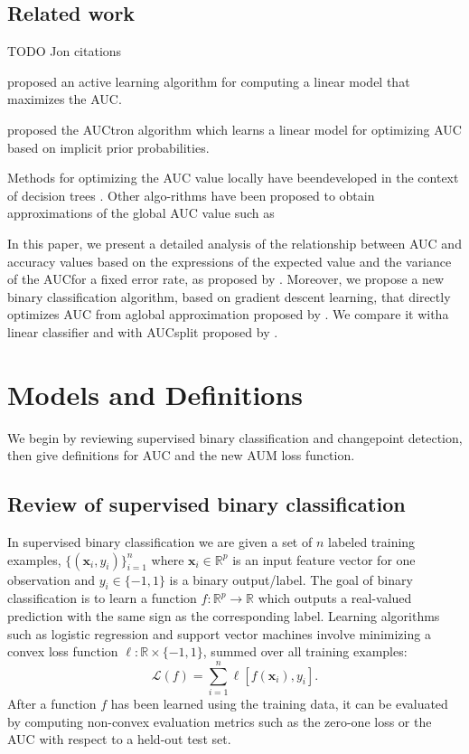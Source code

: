 \documentclass{article}
\begin{document}
\subsection{Related work}
\label{sec:related-work}

TODO Jon citations

\citet{Han2010} proposed an active learning algorithm for computing a linear model that maximizes the AUC.

\citet{castro2008optimization} proposed the AUCtron algorithm which learns a linear model for optimizing AUC based on implicit prior probabilities.

Methods for optimizing the AUC value locally have beendeveloped in the context of decision trees \citep{ferri2002learning}.  Other algo-rithms have been proposed to obtain approximations of the global AUC value such as \citep{yan2003optimizing, rakotomamonjy2004optimizing, herschtal2004optimising, herschtal2006area}

In this paper, we present a detailed analysis of the relationship between AUC and accuracy values based on the expressions of the expected value and the variance of the AUCfor a fixed error rate, as proposed by \citep{ferri2002learning}. Moreover, we propose a new binary classification algorithm, based on gradient descent learning, that directly optimizes AUC from aglobal approximation proposed by \citep{yan2003optimizing}. We compare it witha linear classifier and with AUCsplit proposed by \citep{ferri2002learning}.



\section{Models and Definitions}
\label{sec:model}
We begin by reviewing supervised binary classification and changepoint detection, then give definitions for AUC and the new AUM loss function.
\subsection{Review of supervised binary classification}

In supervised binary classification we are given a set of $n$ labeled training examples, $\{(\mathbf x_i, y_i)\}_{i=1}^n$ where $\mathbf x_i\in\mathbb R^p$ is an input feature vector for one observation and $y_i\in\{-1,1\}$ is a binary output/label.
The goal of binary classification is to learn a function $f:\mathbb R^p\rightarrow \mathbb R$ which outputs a real-valued prediction with the same sign as the corresponding label.
Learning algorithms such as logistic regression and support vector machines involve minimizing a convex loss function $\ell:\mathbb R\times \{-1,1\}$, summed over all training examples:
\begin{equation}
\label{eq:loss-sum-over-examples}
    \mathcal L(f) =  \sum_{i=1}^n \ell[ f(\mathbf x_i), y_i].
\end{equation}
After a function $f$ has been learned using the training data, it can be evaluated by computing non-convex evaluation metrics such as the zero-one loss or the AUC with respect to a held-out test set.
\end{document}
